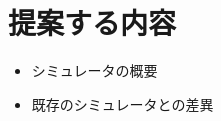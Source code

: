 \chapter{提案する内容} \label{method}

\begin{itemize}
\item {
  シミュレータの概要
}
\item {
  既存のシミュレータとの差異
}
\end{itemize}
